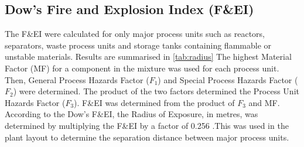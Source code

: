 \subsection{Dow's Fire and Explosion Index (F\&EI)}
The F\&EI were calculated for only major process units such as reactors, separators, waste process units and storage tanks containing flammable or unstable materials. Results are summarised in \cref{tab:radius} The highest Material Factor (MF) for a component in the mixture was used for each process unit. Then, General Process Hazards Factor ($F_1$) and Special Process Hazards Factor ($F_2$) were determined. The product of the two factors determined the Process Unit Hazards Factor ($F_3$). F\&EI was determined from the product of $F_3$ and MF. According to the Dow's F\&EI, the Radius of Exposure, in metres, was determined by multiplying the F\&EI by a factor of 0.256 \cite{aiche_dows_1994}.This was used in the plant layout to determine the separation distance between major process units.    